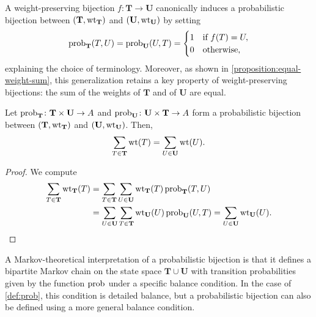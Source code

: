 A weight-preserving bijection \( f \colon \mathbf{T} \to \mathbf{U} \)
canonically induces a probabilistic bijection
between \((\mathbf{T}, \wt_{\mathbf{T}})\) and \((\mathbf{U}, \wt_{\mathbf{U}})\)
by setting
\begin{equation*}
	\operatorname{prob}_{\mathbf{T}}(T, U) = \operatorname{prob}_{\mathbf{U}}(U, T) =
	\begin{cases}
		1 & \text{if } f(T) = U, \\
		0 & \text{otherwise},
	\end{cases}
\end{equation*}
explaining the choice of terminology.
Moreover, as shown in \cref{proposition:equal-weight-sum},
this generalization retains a key property of weight-preserving bijections:
the sum of the weights of \(\mathbf{T}\) and of \(\mathbf{U}\) are equal.

\begin{proposition}
	\label{proposition:equal-weight-sum}
	Let \(\operatorname{prob}_{\mathbf{T}} \colon \mathbf{T} \times \mathbf{U} \to A\)
	and \(\operatorname{prob}_{\mathbf{U}} \colon \mathbf{U} \times \mathbf{T} \to A\)
	form a probabilistic bijection between
	\( (\mathbf{T}, \wt_{\mathbf{T}}) \) and
	\( (\mathbf{U}, \wt_{\mathbf{U}}) \).
	Then,
	\begin{equation*}
		\sum_{T \in \mathbf{T}} \wt(T) = \sum_{U \in\mathbf{U}} \wt(U).
	\end{equation*}
\end{proposition}

\begin{proof}
	We compute
	\begin{align*}
		\sum_{T \in \mathbf{T}} \wt_{\mathbf{T}}(T)
		&= \sum_{T \in \mathbf{T}} \sum_{U \in \mathbf{U}}
			\wt_{\mathbf{T}}(T) \prob{\mathbf{T}}(T, U) \\
		&= \sum_{U \in \mathbf{U}} \sum_{T \in \mathbf{T}}
			\wt_{\mathbf{U}}(U) \prob{\mathbf{U}}(U, T)
		= \sum_{U \in \mathbf{U}} \wt_{\mathbf{U}}(U). \qedhere
	\end{align*}
\end{proof}

A Markov-theoretical interpretation of a probabilistic bijection is that
it defines a bipartite Markov chain on the state space \( \mathbf{T} \cup \mathbf{U} \)
with transition probabilities given by the function \( \operatorname{prob}_{} \) under a specific balance condition.
In the case of \cref{def:prob}, this condition is detailed balance,
but a probabilistic bijection can also be defined using a more general balance condition.

